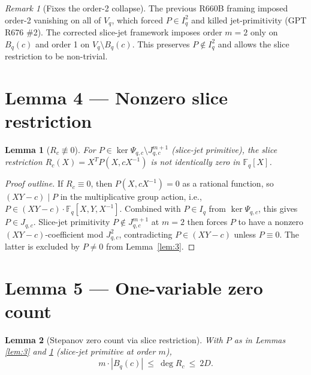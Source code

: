 \documentclass[12pt]{amsart}
\newtheorem{lemma}{Lemma}
\theoremstyle{definition}
\theoremstyle{remark}
\newtheorem{remark}{Remark}
\begin{document}
\begin{remark}[Fixes the order-2 collapse]
The previous R660B framing imposed order-2 vanishing on all of $V_q$, which forced
$P \in I_q^2$ and killed jet-primitivity (GPT R676 \#2). The corrected slice-jet
framework imposes order $m=2$ only on $B_q(c)$ and order 1 on $V_q \setminus B_q(c)$.
This preserves $P \notin I_q^2$ and allows the slice restriction to be non-trivial.
\end{remark}

\section{Lemma 4 --- Nonzero slice restriction}

\begin{lemma}[$R_c \not\equiv 0$]\label{lem:4}
For $P \in \ker \Psi_{q, c} \setminus J_{q, c}^{m+1}$ (slice-jet primitive),
the slice restriction $R_c(X) = X^T P(X, c X^{-1})$ is not identically zero in $\mathbb{F}_q[X]$.
\end{lemma}

\begin{proof}[Proof outline]
If $R_c \equiv 0$, then $P(X, c X^{-1}) = 0$ as a rational function, so
$(XY - c) \mid P$ in the multiplicative group action, i.e., $P \in (X Y - c) \cdot \mathbb{F}_q[X, Y, X^{-1}]$.
Combined with $P \in I_q$ from $\ker \Psi_{q, c}$, this gives $P \in J_{q, c}$.
Slice-jet primitivity $P \notin J_{q, c}^{m+1}$ at $m = 2$ then forces $P$ to have a
nonzero $(XY - c)$-coefficient mod $J_{q, c}^2$, contradicting $P \in (XY - c)$
unless $P \equiv 0$. The latter is excluded by $P \ne 0$ from Lemma~\ref{lem:3}.
\end{proof}

\section{Lemma 5 --- One-variable zero count}

\begin{lemma}[Stepanov zero count via slice restriction]\label{lem:5}
With $P$ as in Lemmas \ref{lem:3} and \ref{lem:4} (slice-jet primitive at order $m$),
$$
m \cdot |B_q(c)|\ \le\ \deg R_c\ \le\ 2 D.
$$
\end{lemma}
\end{document}
